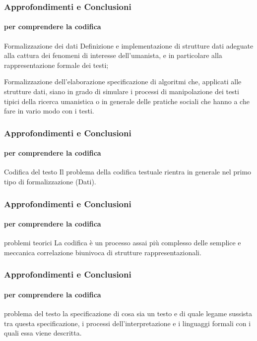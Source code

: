 \begin{frame}
	\frametitle{Approfondimenti e Conclusioni}
	\framesubtitle{per comprendere la codifica}
	\addtocounter{nframe}{1}

	\begin{block}{Formalizzazione dei dati}
		Definizione e implementazione di strutture dati adeguate alla cattura dei fenomeni di interesse dell’umanista, e in particolare alla rappresentazione formale dei testi;
	\end{block}

	\begin{block}{Formalizzazione dell'elaborazione}
		specificazione di algoritmi che, applicati alle strutture dati, siano in grado di simulare i processi di manipolazione dei testi tipici della ricerca umanistica o in generale delle pratiche sociali che hanno a che fare in vario modo con i testi.
	\end{block}

\end{frame}


\begin{frame}
	\frametitle{Approfondimenti e Conclusioni}
	\framesubtitle{per comprendere la codifica}
	\addtocounter{nframe}{1}

	\begin{block}{Codifica del testo}
		Il problema della codifica testuale rientra in generale nel primo tipo di formalizzazione (Dati).
	\end{block}

\end{frame}

\begin{frame}
	\frametitle{Approfondimenti e Conclusioni}
	\framesubtitle{per comprendere la codifica}
	\addtocounter{nframe}{1}

	\begin{block}{problemi teorici}
		La codifica è un processo assai più complesso delle semplice e meccanica correlazione biunivoca di strutture rappresentazionali.
	\end{block}

\end{frame}

\begin{frame}
	\frametitle{Approfondimenti e Conclusioni}
	\framesubtitle{per comprendere la codifica}
	\addtocounter{nframe}{1}

	\begin{block}{problema del testo}
		la specificazione di cosa sia un testo e di quale legame sussista tra questa specificazione, i processi dell’interpretazione e i linguaggi formali con i quali essa viene descritta.
	\end{block}

\end{frame}

